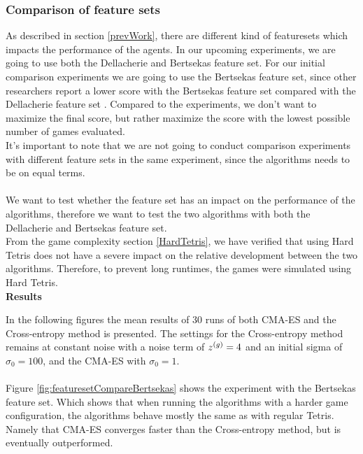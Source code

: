 \subsubsection{Comparison of feature sets  \label{compoffeatureset}}
As described in section \ref{prevWork}, there are different kind of featuresets which
impacts the performance of the agents. In our upcoming experiments, we are going to
use both the Dellacherie and Bertsekas feature set. For our initial comparison experiments
we are going to use the Bertsekas feature set, since other researchers report
a lower score with the Bertsekas feature set compared with the Dellacherie feature set
\citep{thiery:09}. Compared to the \citep{thiery:09} experiments, we don't want to maximize the
final score, but rather maximize the score with the lowest possible number of 
games evaluated.\\
It's important to note that we are not going to conduct comparison experiments with different
feature sets in the same experiment, since the algorithms needs to be on equal terms.\\
\\
We want to test whether the feature set has an impact on the performance of the algorithms,
therefore we want to test the two algorithms with both the Dellacherie and Bertsekas feature set.\\
From the game complexity section \ref{HardTetris}, we have verified that using Hard Tetris
\citep{boumaza2009} does not have a severe impact on the relative 
development between the two algorithms.
Therefore, to prevent long runtimes, the games were simulated
using Hard Tetris.\\

\textbf{Results}

In the following figures the mean results of 30 runs of both CMA-ES and the Cross-entropy method is presented. The settings for the Cross-entropy method remains at constant noise
with a noise term of $z^{(g)} = 4$ and an initial sigma of $\sigma_0 = 100$, 
and the CMA-ES with $\sigma_0 = 1$.\\
\\
Figure \ref{fig:featuresetCompareBertsekas} shows the experiment with the 
Bertsekas feature set. Which shows that when running the algorithms with a
harder game configuration, the algorithms behave mostly the same as with regular 
Tetris. Namely that CMA-ES converges faster than the Cross-entropy method, 
but is eventually outperformed.

